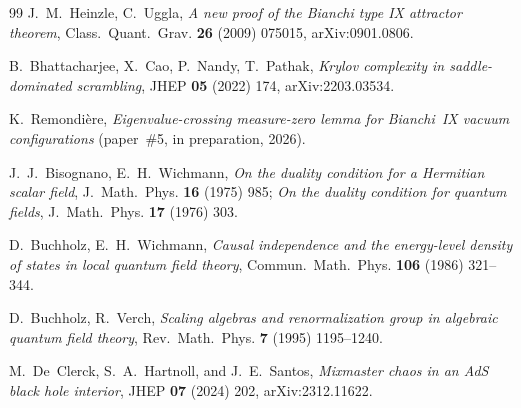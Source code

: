 \documentclass[12pt,a4paper]{article}
\begin{document}
\begin{thebibliography}{99}
J.~M.~Heinzle, C.~Uggla,
\emph{A new proof of the Bianchi type IX attractor theorem},
Class.~Quant.~Grav. \textbf{26} (2009) 075015, arXiv:0901.0806.

B.~Bhattacharjee, X.~Cao, P.~Nandy, T.~Pathak,
\emph{Krylov complexity in saddle-dominated scrambling},
JHEP \textbf{05} (2022) 174, arXiv:2203.03534.

K.~Remondi\`ere,
\emph{Eigenvalue-crossing measure-zero lemma for Bianchi~IX vacuum
configurations} (paper~\#5, in preparation, 2026).

J.~J.~Bisognano, E.~H.~Wichmann,
\emph{On the duality condition for a Hermitian scalar field},
J.~Math.~Phys. \textbf{16} (1975) 985;
\emph{On the duality condition for quantum fields},
J.~Math.~Phys. \textbf{17} (1976) 303.

D.~Buchholz, E.~H.~Wichmann,
\emph{Causal independence and the energy-level density of states in local
quantum field theory},
Commun.~Math.~Phys. \textbf{106} (1986) 321--344.

D.~Buchholz, R.~Verch,
\emph{Scaling algebras and renormalization group in algebraic quantum field
theory},
Rev.~Math.~Phys. \textbf{7} (1995) 1195--1240.

M.~De~Clerck, S.~A.~Hartnoll, and J.~E.~Santos,
\emph{Mixmaster chaos in an AdS black hole interior},
JHEP \textbf{07} (2024) 202, arXiv:2312.11622.

\end{thebibliography}
\end{document}
